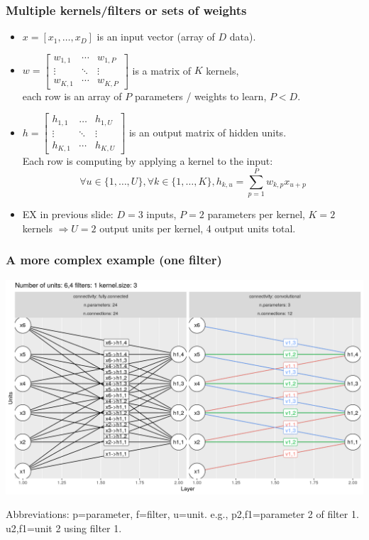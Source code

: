 \documentclass{beamer}
\begin{document}
\begin{frame}
  \frametitle{Multiple kernels/filters or sets of weights}
  \begin{itemize}
  \item $x = [ x_1, \dots, x_D ]$ is an input vector (array of $D$ data).
  \item $w = \begin{bmatrix}
      w_{1,1} & \cdots & w_{1,P} \\
      \vdots & \ddots & \vdots \\
      w_{K,1} & \cdots & w_{K,P}
    \end{bmatrix}$ is a matrix of $K$ kernels,\\each row is an array of
    $P$ parameters / weights to learn, $P<D$.
  \item $h = \begin{bmatrix}
      h_{1,1} & \dots & h_{1,U} \\
      \vdots & \ddots & \vdots \\
      h_{K,1} & \cdots & h_{K,U}
      \end{bmatrix}$ is an output matrix of
      hidden units. \\
      Each row is computing by applying a kernel to the input:
      $$
      \forall u\in\{1,\dots,U\},
      \forall k\in\{1,\dots,K\},
      h_{k,u} = \sum_{p=1}^P w_{k,p} x_{u+p}
      $$
    \item EX in previous slide: $D=3$ inputs, $P=2$ parameters per
      kernel, $K=2$ kernels $\Rightarrow U=2$ output units per kernel,
      4 output units total.
  \end{itemize}
\end{frame}

\begin{frame}
  \frametitle{A more complex example (one filter)}
  \includegraphics[width=\textwidth]{figure-convolutional-filters-6-3-1}
  
  Abbreviations: p=parameter, f=filter, u=unit.
  e.g., p2,f1=parameter 2 of filter 1. u2,f1=unit 2 using filter 1.
\end{frame}
\end{document}
